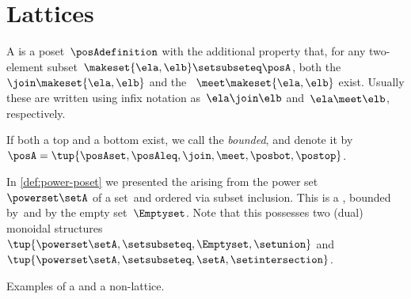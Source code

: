
\section{Lattices}


\begin{definition}[Lattice]
    \label{def:lattice}
    A  is a poset~$\posAdefinition$ with the additional property that, for any two-element subset~$\makeset{\ela, \elb} \setsubseteq \posA$, both the ~$\join \makeset{\ela, \elb}$ and the ~$\meet \makeset{\ela, \elb }$ exist.
    Usually these are written using infix notation as~$\ela \join \elb$ and~$\ela \meet \elb$, respectively.
\end{definition}

\begin{marginfigure}
    \centering
    \caption{}
    \label{fig:lattice-wood}
\end{marginfigure}

\begin{definition}
    \label{def:bounded-lattice}
    If both a top and a bottom exist, we call the  \emph{bounded}, and denote it by~$\posA = \tup{\posAset,{{\posAleq}},\join,\meet,\posbot,\postop}$.
\end{definition}

\begin{example}
    In \cref{def:power-poset} we presented the  arising from the power set~$\powerset \setA$ of a set~\setA and ordered via subset inclusion.
    This is a , bounded by~\setA and by the empty set~$\Emptyset$.
    Note that this  possesses two (dual) monoidal structures~$\tup{\powerset \setA,{{\setsubseteq}},\Emptyset,{{\setunion}}}$ and~$\tup{\powerset \setA,{{\setsubseteq}},\setA,{{\setintersection}}}$.
\end{example}

\begin{marginfigure}
    \centering

    \caption{Examples of a  and a non-lattice. }
    \label{fig:exlattice}
\end{marginfigure}

